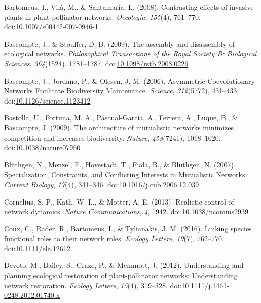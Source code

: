 \documentclass[a4paper]{artikel1}
\theoremstyle{definition}
\theoremstyle{definition}
\theoremstyle{definition}
\theoremstyle{remark}
\begin{document}
\hypertarget{ref-bartomeus_contrasting_2008}{}
Bartomeus, I., Vilà, M., \& Santamaría, L. (2008). Contrasting effects
of invasive plants in plant-pollinator networks. \emph{Oecologia},
\emph{155}(4), 761--770.
doi:\href{https://doi.org/10.1007/s00442-007-0946-1}{10.1007/s00442-007-0946-1}

\hypertarget{ref-bascompte_assembly_2009}{}
Bascompte, J., \& Stouffer, D. B. (2009). The assembly and disassembly
of ecological networks. \emph{Philosophical Transactions of the Royal
Society B: Biological Sciences}, \emph{364}(1524), 1781--1787.
doi:\href{https://doi.org/10.1098/rstb.2008.0226}{10.1098/rstb.2008.0226}

\hypertarget{ref-bascompte_asymmetric_2006}{}
Bascompte, J., Jordano, P., \& Olesen, J. M. (2006). Asymmetric
Coevolutionary Networks Facilitate Biodiversity Maintenance.
\emph{Science}, \emph{312}(5772), 431--433.
doi:\href{https://doi.org/10.1126/science.1123412}{10.1126/science.1123412}

\hypertarget{ref-bastolla_architecture_2009}{}
Bastolla, U., Fortuna, M. A., Pascual-García, A., Ferrera, A., Luque,
B., \& Bascompte, J. (2009). The architecture of mutualistic networks
minimizes competition and increases biodiversity. \emph{Nature},
\emph{458}(7241), 1018--1020.
doi:\href{https://doi.org/10.1038/nature07950}{10.1038/nature07950}

\hypertarget{ref-bluthgen_specialization_2007}{}
Blüthgen, N., Menzel, F., Hovestadt, T., Fiala, B., \& Blüthgen, N.
(2007). Specialization, Constraints, and Conflicting Interests in
Mutualistic Networks. \emph{Current Biology}, \emph{17}(4), 341--346.
doi:\href{https://doi.org/10.1016/j.cub.2006.12.039}{10.1016/j.cub.2006.12.039}

\hypertarget{ref-cornelius_realistic_2013}{}
Cornelius, S. P., Kath, W. L., \& Motter, A. E. (2013). Realistic
control of network dynamics. \emph{Nature Communications}, \emph{4},
1942. doi:\href{https://doi.org/10.1038/ncomms2939}{10.1038/ncomms2939}

\hypertarget{ref-coux_linking_2016}{}
Coux, C., Rader, R., Bartomeus, I., \& Tylianakis, J. M. (2016). Linking
species functional roles to their network roles. \emph{Ecology Letters},
\emph{19}(7), 762--770.
doi:\href{https://doi.org/10.1111/ele.12612}{10.1111/ele.12612}

\hypertarget{ref-devoto_understanding_2012}{}
Devoto, M., Bailey, S., Craze, P., \& Memmott, J. (2012). Understanding
and planning ecological restoration of plant-pollinator networks:
Understanding network restoration. \emph{Ecology Letters}, \emph{15}(4),
319--328.
doi:\href{https://doi.org/10.1111/j.1461-0248.2012.01740.x}{10.1111/j.1461-0248.2012.01740.x}
\end{document}
